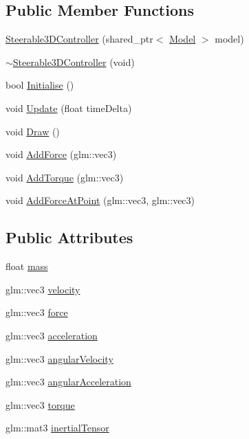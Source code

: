 \subsection*{Public Member Functions}
\begin{DoxyCompactItemize}
\item 
\hyperlink{class_b_g_e_1_1_steerable3_d_controller_af91a003d39005a501ea6d967c2cc492c}{Steerable3\-D\-Controller} (shared\-\_\-ptr$<$ \hyperlink{class_b_g_e_1_1_model}{Model} $>$ model)
\item 
\hyperlink{class_b_g_e_1_1_steerable3_d_controller_a3f95ad47e80c7f6ecaee92764c260767}{$\sim$\-Steerable3\-D\-Controller} (void)
\item 
bool \hyperlink{class_b_g_e_1_1_steerable3_d_controller_a0910cbd4a500b78c3fad063b5359a88f}{Initialise} ()
\item 
void \hyperlink{class_b_g_e_1_1_steerable3_d_controller_a2bb51b669aa98dbed7a5afcc49ed33aa}{Update} (float time\-Delta)
\item 
void \hyperlink{class_b_g_e_1_1_steerable3_d_controller_af3fce1f3beda747d758315951f2764fe}{Draw} ()
\item 
void \hyperlink{class_b_g_e_1_1_steerable3_d_controller_ac97df5e7922ca4d2d086d8a04a68a53f}{Add\-Force} (glm\-::vec3)
\item 
void \hyperlink{class_b_g_e_1_1_steerable3_d_controller_a4e61d1ab590e8306d4b3381072737982}{Add\-Torque} (glm\-::vec3)
\item 
void \hyperlink{class_b_g_e_1_1_steerable3_d_controller_ac7feb550751d48444f0d7da92954fca0}{Add\-Force\-At\-Point} (glm\-::vec3, glm\-::vec3)
\end{DoxyCompactItemize}
\subsection*{Public Attributes}
\begin{DoxyCompactItemize}
\item 
float \hyperlink{class_b_g_e_1_1_steerable3_d_controller_aa61c5d262cf69888bec16bf09c211bd8}{mass}
\item 
glm\-::vec3 \hyperlink{class_b_g_e_1_1_steerable3_d_controller_a20c68fc0563636782e2682be3e4926d0}{velocity}
\item 
glm\-::vec3 \hyperlink{class_b_g_e_1_1_steerable3_d_controller_ac74b43bbe6a99800595a4091ed34102d}{force}
\item 
glm\-::vec3 \hyperlink{class_b_g_e_1_1_steerable3_d_controller_ad6991bb22a60e26e3fe695d414746a58}{acceleration}
\item 
glm\-::vec3 \hyperlink{class_b_g_e_1_1_steerable3_d_controller_ae6729d6b39e2743d8ebd87c8bf4b31af}{angular\-Velocity}
\item 
glm\-::vec3 \hyperlink{class_b_g_e_1_1_steerable3_d_controller_a213dbccf587d0e6539160c7f5f31bf61}{angular\-Acceleration}
\item 
glm\-::vec3 \hyperlink{class_b_g_e_1_1_steerable3_d_controller_a5492963384aaba531357a411dab047e6}{torque}
\item 
glm\-::mat3 \hyperlink{class_b_g_e_1_1_steerable3_d_controller_af5559872afa14a177eb5c6f6d1d773b4}{inertial\-Tensor}
\end{DoxyCompactItemize}


